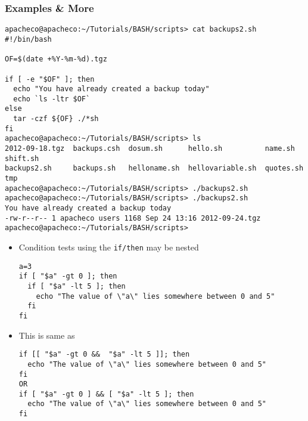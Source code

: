 \documentclass[slidestop,mathserif,compress,xcolor=svgnames]{beamer}
\begin{document}
\begin{frame}
  \frametitle{\small Examples \& More}
  {\tiny
  \begin{verbatim}
apacheco@apacheco:~/Tutorials/BASH/scripts> cat backups2.sh
#!/bin/bash

OF=$(date +%Y-%m-%d).tgz

if [ -e "$OF" ]; then
  echo "You have already created a backup today"
  echo `ls -ltr $OF`
else
  tar -czf ${OF} ./*sh
fi
apacheco@apacheco:~/Tutorials/BASH/scripts> ls
2012-09-18.tgz  backups.csh  dosum.sh      hello.sh          name.sh    shift.sh
backups2.sh     backups.sh   helloname.sh  hellovariable.sh  quotes.sh  tmp
apacheco@apacheco:~/Tutorials/BASH/scripts> ./backups2.sh 
apacheco@apacheco:~/Tutorials/BASH/scripts> ./backups2.sh 
You have already created a backup today
-rw-r--r-- 1 apacheco users 1168 Sep 24 13:16 2012-09-24.tgz
apacheco@apacheco:~/Tutorials/BASH/scripts>
  \end{verbatim}
  }
  \framebreak
  \begin{itemize}
    \item Condition tests using the \texttt{if/then} may be nested
    {\tiny
      \begin{verbatim}
a=3
if [ "$a" -gt 0 ]; then
  if [ "$a" -lt 5 ]; then
    echo "The value of \"a\" lies somewhere between 0 and 5"
  fi
fi
      \end{verbatim}
    }
    \item This is same as 
    {\tiny
      \begin{verbatim}
if [[ "$a" -gt 0 &&  "$a" -lt 5 ]]; then
  echo "The value of \"a\" lies somewhere between 0 and 5"
fi
OR
if [ "$a" -gt 0 ] && [ "$a" -lt 5 ]; then
  echo "The value of \"a\" lies somewhere between 0 and 5"
fi
      \end{verbatim}
    }
  \end{itemize}
\end{frame}
\end{document}
